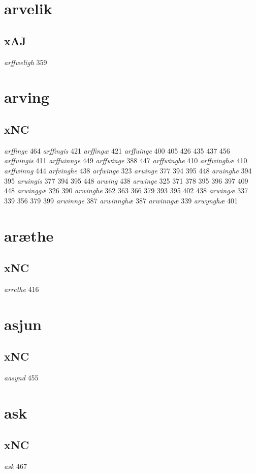 \documentclass[a4paper,twocolumn]{article}
\begin{document}
\section{arvelik}
\label{sec:orgdc72127}
\subsection{xAJ}
\label{sec:org6d62e8f}
\emph{arffweligh} 359 
\section{arving}
\label{sec:org338d53a}
\subsection{xNC}
\label{sec:orga1be725}
\emph{arffinge} 464 \emph{arffingis} 421 \emph{arffingæ} 421 \emph{arffuinge} 400 405 426 435 437 456 \emph{arffuingis} 411 \emph{arffuinnge} 449 \emph{arffwinge} 388 447 \emph{arffwinghe} 410 \emph{arffwinghæ} 410 \emph{arffwinng} 444 \emph{arfvinghe} 438 \emph{arfwinge} 323 \emph{aruinge} 377 394 395 448 \emph{aruinghe} 394 395 \emph{aruingis} 377 394 395 448 \emph{arwing} 438 \emph{arwinge} 325 371 378 395 396 397 409 448 \emph{arwinggæ} 326 390 \emph{arwinghe} 362 363 366 379 393 395 402 438 \emph{arwingæ} 337 339 356 379 399 \emph{arwinnge} 387 \emph{arwinnghæ} 387 \emph{arwinngæ} 339 \emph{arwynghæ} 401 
\section{aræthe}
\label{sec:org2379e30}
\subsection{xNC}
\label{sec:org0e92ae6}
\emph{arrethe} 416 
\section{asjun}
\label{sec:org5b1f12d}
\subsection{xNC}
\label{sec:org1998676}
\emph{aasynd} 455 
\section{ask}
\label{sec:orgaa9b5d1}
\subsection{xNC}
\label{sec:org5f5f251}
\emph{ask} 467 
\end{document}
